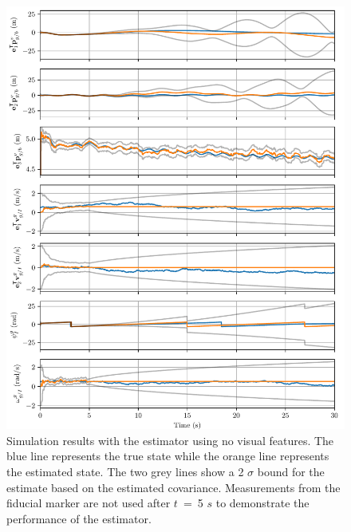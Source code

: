 \begin{figure}
  \centering
  \includegraphics[width=6.5in]{plots/single_run_no_lms}
  \caption{Simulation results with the estimator using no visual
  features. The blue line represents the true state while the orange line
  represents the estimated state. The two grey lines show a 2 $\sigma$ bound for
  the estimate based on the estimated covariance. Measurements from the fiducial
  marker are not used after $t$~=~5
$s$ to demonstrate the performance of the estimator.}
  \label{fig:no_lms}
\end{figure}

